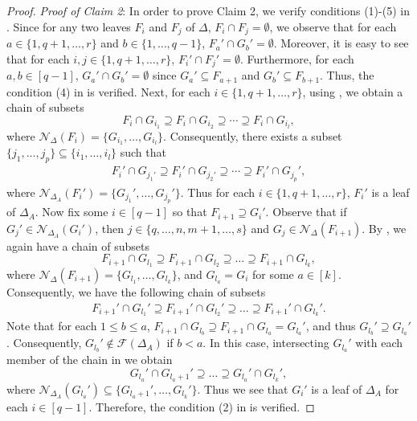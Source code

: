 \documentclass[12pt,a4paper,reqno]{amsart}
\theoremstyle{definition}
\def\D{\Delta}
\def\F{\mathcal{F}}
\def\N{\mathcal{N}}
\begin{document}
\begin{proof}
\noindent
\textit{Proof of Claim 2}: In order to prove Claim 2, we verify conditions (1)-(5) in . Since for any two leaves $F_i$ and $F_j$ of $\Delta$, $F_i\cap F_j=\emptyset$, we observe that for each $a\in\{1,q+1,\ldots,r\}$ and $b\in\{1,\ldots,q-1\}$, $F_a'\cap G_b'=\emptyset$. Moreover, it is easy to see that for each $i,j\in\{1,q+1,\ldots,r\}$, $F_i'\cap F_j'=\emptyset$. Furthermore, for each $a,b\in [q-1]$, $G_a'\cap G_b'=\emptyset$ since $G_a'\subseteq F_{a+1}$ and $G_b'\subseteq F_{b+1}$. Thus, the condition (4) in  is verified. Next, for each $i\in\{1,q+1,\ldots, r\}$, using , we obtain a chain of subsets
\[
F_i\cap G_{i_1}\supseteq F_i\cap G_{i_2}\supseteq\cdots\supseteq F_i\cap G_{i_l},
\]
where $\N_{\D}(F_i)=\{G_{i_1},\ldots, G_{i_l}\}$. Consequently, there exists a subset $\{j_1,\ldots,j_p\}\subseteq \{i_1,\ldots,i_l\}$ such that 
\begin{align}\label{equation 1}
F_i'\cap G_{j_1'}\supseteq F_i'\cap G_{j_2'}\supseteq\cdots\supseteq F_i'\cap G_{j_p}',
\end{align}
where $\N_{\Delta_A}(F_i')=\{G_{j_1}',\ldots,G_{j_p}'\}$. Thus for each $i\in\{1,q+1,\ldots,r\}$, $F_i'$ is a leaf of $\Delta_A$. Now fix some $i\in[q-1]$ so that $F_{i+1}\supseteq G_i'$. Observe that if $G_j'\in \N_{\Delta_A}(G_i')$, then $j\in\{q,\ldots,n,m+1,\ldots,s\}$ and $G_j\in \N_{\D}(F_{i+1})$. By , we again have a chain of subsets
\[
F_{i+1}\cap G_{l_1}\supseteq F_{i+1}\cap G_{l_2}\supseteq\dots\supseteq F_{i+1}\cap G_{l_k},
\]
where $\N_{\D}(F_{i+1})=\{G_{l_1},\ldots,G_{l_k}\}$, and $G_{l_a}=G_i$ for some $a\in[k]$. Consequently, we have the following chain of subsets
\begin{align}\label{equation 41}
F_{i+1}'\cap G_{l_1}'\supseteq F_{i+1}'\cap G_{l_2}'\supseteq\dots\supseteq F_{i+1}'\cap G_{l_k}'.
\end{align}
Note that for each $1\le b\le a$, $F_{i+1}\cap G_{l_b}\supseteq F_{i+1}\cap G_{l_a}=G_{l_a}'$, and thus $G_{l_b}'\supseteq G_{l_a}'$. Consequently, $G_{l_b}'\notin\F(\Delta_A)$ if $b<a$. In this case, intersecting $G_{l_a}'$ with each member of the chain in  we obtain
\[
G_{l_a}'\cap G_{l_a+1}'\supseteq \dots\supseteq G_{l_a}'\cap G_{l_k}',
\]
where $\N_{\D_A}(G_{l_a}')\subseteq \{G_{l_a+1}',\ldots,G_{l_k}'\}$. Thus we see that $G_i'$ is a leaf of $\D_{A}$ for each $i\in[q-1]$. Therefore, the condition (2) in  is verified. 


\end{proof}
\end{document}

